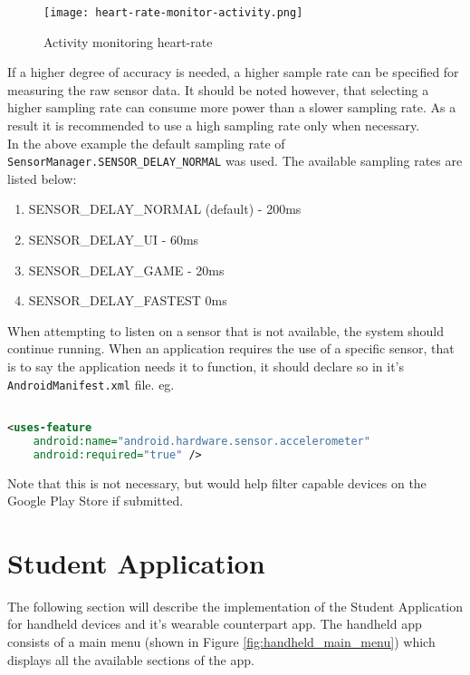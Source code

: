 \begin{figure}
    \centering
    \texttt{[image: heart-rate-monitor-activity.png]}
    \caption{Activity monitoring heart-rate}
    \label{fig:awesome_image}
\end{figure}

If a higher degree of accuracy is needed, a higher sample rate can be specified
for measuring the raw sensor data. It should be noted however, that selecting a
higher sampling rate can consume more power than a slower sampling rate. As a
result it is recommended to use a high sampling rate only when necessary.\\
In the above example the default sampling rate of
\texttt{SensorManager.SENSOR\_DELAY\_NORMAL} was used. The available sampling
rates are listed below:
\begin{enumerate}
\item SENSOR\_DELAY\_NORMAL (default) - 200ms
\item SENSOR\_DELAY\_UI - 60ms
\item SENSOR\_DELAY\_GAME - 20ms
\item SENSOR\_DELAY\_FASTEST 0ms
\end{enumerate}

When attempting to listen on a sensor that is not available, the system should
continue running. When an application requires the use of a specific sensor,
that is to say the application needs it to function, it should declare so in
it's \texttt{AndroidManifest.xml} file. eg.

\begin{lstlisting}[language=XML]

<uses-feature
    android:name="android.hardware.sensor.accelerometer"
    android:required="true" />

\end{lstlisting}

Note that this is not necessary, but would help filter capable devices on the 
Google Play Store if submitted.




\section{Student Application}

The following section will describe the implementation of the Student
Application for handheld devices and it's wearable counterpart app. The handheld
app consists of a main menu (shown in Figure \ref{fig:handheld_main_menu}) which displays all the
available sections of the app.

